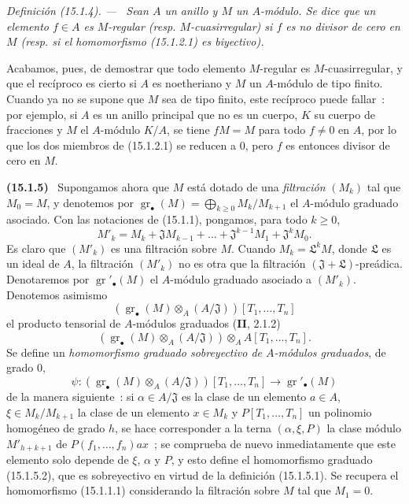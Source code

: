 \documentclass[10pt,oneside]{book}
\makeatletter
\newcommand{\gr}{\operatorname{gr}}
\newcommand{\setmanualcurrentlabel}[1]{\def\@currentlabel{#1}}
\newcommand{\oldpage}[2][]{%
  \setcounter{footnote}{0}%
  \marginpar{\scriptsize\textbf{#1}~|~#2}\ignorespaces}
\newenvironment{env}[1][]{\setmanualcurrentlabel{#1}\par\medskip\noindent\textbf{(#1)}\ }{\par}
\newenvironment{definition}[1][]{%
  \setmanualcurrentlabel{#1}\par\medskip\noindent\itshape Definición (#1). ---\ }{\par}
\makeatother
\begin{document}
\begin{definition}[15.1.4]
\label{0.15.1.4-es}
Sean $A$ un anillo y $M$ un $A$-módulo. Se dice que un elemento $f\in A$ es
$M$-regular (\textup{resp.} $M$-cuasirregular) si $f$ es no divisor de
cero en $M$ (\textup{resp.} si el homomorfismo (15.1.2.1) es biyectivo).
\end{definition}

Acabamos, pues, de demostrar que todo elemento $M$-regular es
$M$-cuasirregular, y que el recíproco es cierto si $A$ es noetheriano y $M$
un $A$-módulo de tipo finito. Cuando ya no se supone que $M$ sea de tipo
finito, este recíproco puede fallar~: por ejemplo, si $A$ es un anillo
principal que no es un cuerpo, $K$ su cuerpo de fracciones y $M$ el
$A$-módulo $K/A$, se tiene $fM=M$ para todo $f\neq0$ en $A$, por lo que los
dos miembros de (15.1.2.1) se reducen a $0$, pero $f$ es entonces divisor de
cero en $M$.

\begin{env}[15.1.5]
\label{0.15.1.5-es}
\oldpage[0\textsubscript{IV-1}]{14}
Supongamos ahora que $M$ está dotado de una \emph{filtración} $(M_k)$ tal que
$M_0=M$, y denotemos por
$\gr_\bullet(M)=\bigoplus_{k\geq0}M_k/M_{k+1}$ el $A$-módulo graduado asociado.
Con las notaciones de (15.1.1), pongamos, para todo $k\geq0$,
\[
  M'_k=M_k+\mathfrak{J}M_{k-1}+\ldots+
  \mathfrak{J}^{k-1}M_1+\mathfrak{J}^kM_0.
  \tag{15.1.5.1}\label{0.15.1.5.1-es}
\]
Es claro que $(M'_k)$ es una filtración sobre $M$. Cuando
$M_k=\mathfrak L^kM$, donde $\mathfrak L$ es un ideal de $A$, la filtración
$(M'_k)$ no es otra que la filtración
$(\mathfrak{J}+\mathfrak L)$-preádica. Denotaremos por
$\gr'_\bullet(M)$ el $A$-módulo graduado asociado a $(M'_k)$. Denotemos asimismo
\[
  (\gr_\bullet(M)\otimes_A(A/\mathfrak{J}))[T_1,\ldots,T_n]
\]
el producto tensorial de $A$-módulos graduados (\textbf{II}, 2.1.2)
\[
  (\gr_\bullet(M)\otimes_A(A/\mathfrak{J}))
  \otimes_A A[T_1,\ldots,T_n].
\]
Se define un \emph{homomorfismo graduado sobreyectivo de $A$-módulos graduados},
de grado $0$,
\[
  \psi:(\gr_\bullet(M)\otimes_A(A/\mathfrak{J}))[T_1,\ldots,T_n]
  \longrightarrow\gr'_\bullet(M)
  \tag{15.1.5.2}\label{0.15.1.5.2-es}
\]
de la manera siguiente~: si $\alpha\in A/\mathfrak{J}$ es la clase de un
elemento $a\in A$, $\xi\in M_k/M_{k+1}$ la clase de un elemento $x\in M_k$ y
$P[T_1,\ldots,T_n]$ un polinomio homogéneo de grado $h$, se hace corresponder
a la terna $(\alpha,\xi,P)$ la clase módulo $M'_{h+k+1}$ de
$P(f_1,\ldots,f_n)ax$~; se comprueba de nuevo inmediatamente que este elemento
solo depende de $\xi$, $\alpha$ y $P$, y esto define el homomorfismo graduado
(15.1.5.2), que es sobreyectivo en virtud de la definición (15.1.5.1). Se
recupera el homomorfismo (15.1.1.1) considerando la filtración sobre $M$ tal
que $M_1=0$.
\end{env}
\end{document}
